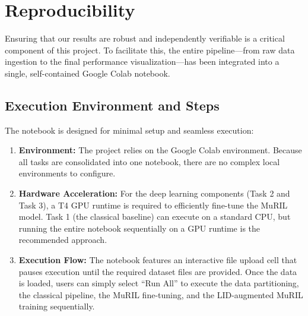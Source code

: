 \section{Reproducibility}

Ensuring that our results are robust and independently verifiable is a critical component of this project. To facilitate this, the entire pipeline—from raw data ingestion to the final performance visualization—has been integrated into a single, self-contained Google Colab notebook. 

\subsection*{Execution Environment and Steps}
The notebook is designed for minimal setup and seamless execution:
\begin{enumerate}
    \item \textbf{Environment:} The project relies on the Google Colab environment. Because all tasks are consolidated into one notebook, there are no complex local environments to configure.
    \item \textbf{Hardware Acceleration:} For the deep learning components (Task 2 and Task 3), a T4 GPU runtime is required to efficiently fine-tune the MuRIL model. Task 1 (the classical baseline) can execute on a standard CPU, but running the entire notebook sequentially on a GPU runtime is the recommended approach.
    \item \textbf{Execution Flow:} The notebook features an interactive file upload cell that pauses execution until the required dataset files are provided. Once the data is loaded, users can simply select ``Run All'' to execute the data partitioning, the classical pipeline, the MuRIL fine-tuning, and the LID-augmented MuRIL training sequentially.
\end{enumerate}

